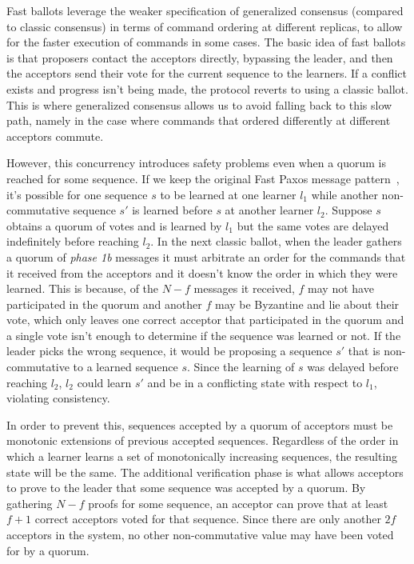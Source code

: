 Fast ballots leverage the weaker specification of generalized consensus (compared to classic consensus) in terms of command ordering at different replicas, to allow for the faster execution of commands in some cases. The basic idea of fast ballots is that proposers contact the acceptors directly, bypassing the leader, and then the acceptors send their vote for the current sequence to the learners. If a conflict exists and progress isn't being made, the protocol reverts to using a classic ballot. This is where generalized consensus allows us to avoid falling back to this slow path, namely in the case where commands that ordered differently at different acceptors commute. \par 
However, this concurrency introduces safety problems even when a quorum is reached for some sequence. If we keep the original Fast Paxos message pattern~\cite{Lamport2006}, it's possible for one sequence $s$ to be learned at one learner $l_1$ while another non-commutative sequence $s'$ is learned before $s$ at another learner $l_2$. Suppose $s$ obtains a quorum of votes and is learned by $l_1$ but the same votes are delayed indefinitely before reaching $l_2$. In the next classic ballot, when the leader gathers a quorum of \textit{phase 1b} messages it must arbitrate an order for the commands that it received from the acceptors and it doesn't know the order in which they were learned. This is because, of the $N-f$ messages it received, $f$ may not have participated in the quorum and another $f$ may be Byzantine and lie about their vote, which only leaves one correct acceptor that participated in the quorum and a single vote isn't enough to determine if the sequence was learned or not. If the leader picks the wrong sequence, it would be proposing a sequence $s'$ that is non-commutative to a learned sequence $s$. Since the learning of $s$ was delayed before reaching $l_2$, $l_2$ could learn $s'$ and be in a conflicting state with respect to $l_1$, violating consistency. {\color{red}In order to prevent this, sequences accepted by a quorum of acceptors must be monotonic extensions of previous accepted sequences. Regardless of the order in which a learner learns a set of monotonically increasing sequences, the resulting state will be the same. The additional verification phase is what allows acceptors to prove to the leader that some sequence was accepted by a quorum. By gathering $N-f$ proofs for some sequence, an acceptor can prove that at least $f+1$ correct acceptors voted for that sequence. Since there are only another $2f$ acceptors in the system, no other non-commutative value may have been voted for by a quorum. \par
}

